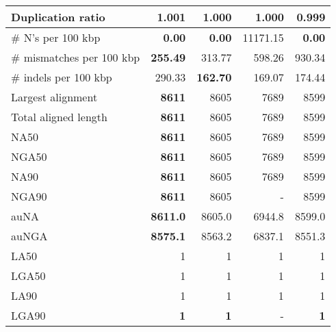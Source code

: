 \documentclass[12pt,a4paper]{article}
\begin{document}
\begin{table}[ht]
\begin{center}
\begin{tabular}{|l*{4}{|r}|}
Duplication ratio & 1.001 & 1.000 & 1.000 & {\bf 0.999} \\ \hline
\# N's per 100 kbp & {\bf 0.00} & {\bf 0.00} & 11171.15 & {\bf 0.00} \\ \hline
\# mismatches per 100 kbp & {\bf 255.49} & 313.77 & 598.26 & 930.34 \\ \hline
\# indels per 100 kbp & 290.33 & {\bf 162.70} & 169.07 & 174.44 \\ \hline
Largest alignment & {\bf 8611} & 8605 & 7689 & 8599 \\ \hline
Total aligned length & {\bf 8611} & 8605 & 7689 & 8599 \\ \hline
NA50 & {\bf 8611} & 8605 & 7689 & 8599 \\ \hline
NGA50 & {\bf 8611} & 8605 & 7689 & 8599 \\ \hline
NA90 & {\bf 8611} & 8605 & 7689 & 8599 \\ \hline
NGA90 & {\bf 8611} & 8605 & - & 8599 \\ \hline
auNA & {\bf 8611.0} & 8605.0 & 6944.8 & 8599.0 \\ \hline
auNGA & {\bf 8575.1} & 8563.2 & 6837.1 & 8551.3 \\ \hline
LA50 & 1 & 1 & 1 & 1 \\ \hline
LGA50 & 1 & 1 & 1 & 1 \\ \hline
LA90 & 1 & 1 & 1 & 1 \\ \hline
LGA90 & {\bf 1} & {\bf 1} & - & {\bf 1} \\ \hline
\end{tabular}
\end{center}
\end{table}
\end{document}
